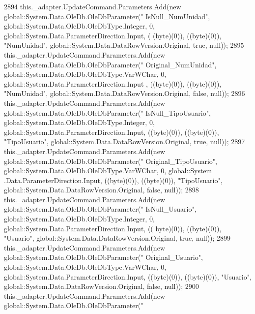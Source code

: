 \begin{DoxyCode}
2894             this.\_adapter.UpdateCommand.Parameters.Add(\textcolor{keyword}{new} global::System.Data.OleDb.OleDbParameter(\textcolor{stringliteral}{"
      IsNull\_NumUnidad"}, global::System.Data.OleDb.OleDbType.Integer, 0, global::System.Data.ParameterDirection.Input, (
      (byte)(0)), ((byte)(0)), \textcolor{stringliteral}{"NumUnidad"}, global::System.Data.DataRowVersion.Original, \textcolor{keyword}{true}, null));
2895             this.\_adapter.UpdateCommand.Parameters.Add(\textcolor{keyword}{new} global::System.Data.OleDb.OleDbParameter(\textcolor{stringliteral}{"
      Original\_NumUnidad"}, global::System.Data.OleDb.OleDbType.VarWChar, 0, global::System.Data.ParameterDirection.Input
      , ((byte)(0)), ((byte)(0)), \textcolor{stringliteral}{"NumUnidad"}, global::System.Data.DataRowVersion.Original, \textcolor{keyword}{false}, null));
2896             this.\_adapter.UpdateCommand.Parameters.Add(\textcolor{keyword}{new} global::System.Data.OleDb.OleDbParameter(\textcolor{stringliteral}{"
      IsNull\_TipoUsuario"}, global::System.Data.OleDb.OleDbType.Integer, 0, global::System.Data.ParameterDirection.Input,
       ((byte)(0)), ((byte)(0)), \textcolor{stringliteral}{"TipoUsuario"}, global::System.Data.DataRowVersion.Original, \textcolor{keyword}{true}, null));
2897             this.\_adapter.UpdateCommand.Parameters.Add(\textcolor{keyword}{new} global::System.Data.OleDb.OleDbParameter(\textcolor{stringliteral}{"
      Original\_TipoUsuario"}, global::System.Data.OleDb.OleDbType.VarWChar, 0, global::System
      .Data.ParameterDirection.Input, ((byte)(0)), ((byte)(0)), \textcolor{stringliteral}{"TipoUsuario"}, global::System.Data.DataRowVersion.Original, \textcolor{keyword}{false}, null));
2898             this.\_adapter.UpdateCommand.Parameters.Add(\textcolor{keyword}{new} global::System.Data.OleDb.OleDbParameter(\textcolor{stringliteral}{"
      IsNull\_Usuario"}, global::System.Data.OleDb.OleDbType.Integer, 0, global::System.Data.ParameterDirection.Input, ((
      byte)(0)), ((byte)(0)), \textcolor{stringliteral}{"Usuario"}, global::System.Data.DataRowVersion.Original, \textcolor{keyword}{true}, null));
2899             this.\_adapter.UpdateCommand.Parameters.Add(\textcolor{keyword}{new} global::System.Data.OleDb.OleDbParameter(\textcolor{stringliteral}{"
      Original\_Usuario"}, global::System.Data.OleDb.OleDbType.VarWChar, 0, global::System.Data.ParameterDirection.Input, 
      ((byte)(0)), ((byte)(0)), \textcolor{stringliteral}{"Usuario"}, global::System.Data.DataRowVersion.Original, \textcolor{keyword}{false}, null));
2900             this.\_adapter.UpdateCommand.Parameters.Add(\textcolor{keyword}{new} global::System.Data.OleDb.OleDbParameter(\textcolor{stringliteral}{"
}
\end{DoxyCode}
